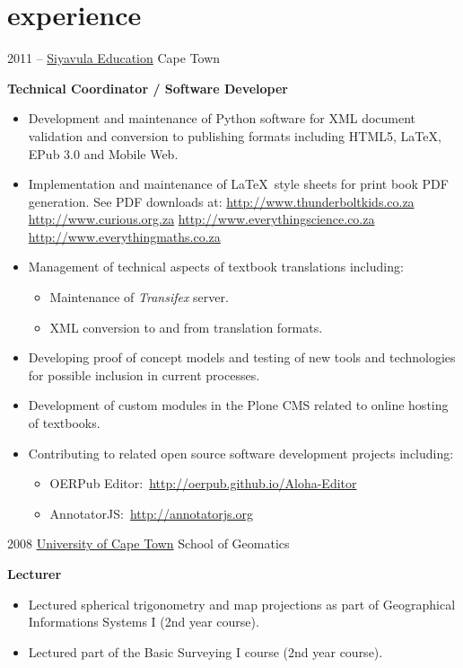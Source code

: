 \documentclass[]{friggeri-cv} %
\begin{document}
\section{experience}
\begin{entrylist}
\entry
{2011 -- }
{\href{http://www.siyavula.com}{Siyavula Education}}
{Cape Town}
{%
\textbf{Technical Coordinator / Software Developer}
\begin{itemize}
\setlength{\itemsep}{5pt}
\item Development and maintenance of Python software for XML document validation and conversion to publishing formats including HTML5, \LaTeX, EPub 3.0 and Mobile Web.
\item Implementation and maintenance of \LaTeX~style sheets for print book PDF generation. See PDF downloads at:
    \subitem \url{http://www.thunderboltkids.co.za}
    \subitem \url{http://www.curious.org.za}
    \subitem \url{http://www.everythingscience.co.za}
    \subitem \url{http://www.everythingmaths.co.za}

\item Management of technical aspects of textbook translations including:
\begin{itemize}
    \renewcommand{\labelitemii}{$\cdot$}
    \item Maintenance of \emph{Transifex} server.
    \item XML conversion to and from translation formats.
\end{itemize}

\item Developing proof of concept models and testing of new tools and technologies for possible inclusion in current processes.

\item Development of custom modules in the Plone CMS related to online hosting of textbooks.

\item Contributing to related open source software development projects including:
\begin{itemize}
    \renewcommand{\labelitemii}{$\cdot$}
    \item OERPub Editor:~\url{http://oerpub.github.io/Aloha-Editor}
    \item AnnotatorJS:~\url{http://annotatorjs.org}
\end{itemize}
\end{itemize}
}
\end{entrylist}
\begin{entrylist}
%
\entry
{2008}
{\href{http://www.uct.ac.za}{University of Cape Town}}
{School of Geomatics}
{%
\textbf{Lecturer}
\begin{itemize}
\setlength{\itemsep}{5pt}
    \item Lectured spherical trigonometry and map projections as part of Geographical Informations Systems I (2nd year course).
    \item Lectured part of the Basic Surveying I course (2nd year course).
\end{itemize}
}
\end{entrylist}
\end{document}
